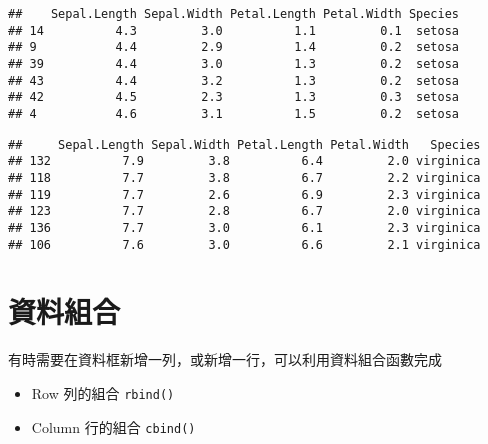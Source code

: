 \documentclass[]{book}
\newenvironment{Shaded}{\begin{snugshade}}{\end{snugshade}}
\newcommand{\KeywordTok}[1]{\textcolor[rgb]{0.13,0.29,0.53}{\textbf{{#1}}}}
\newcommand{\DataTypeTok}[1]{\textcolor[rgb]{0.13,0.29,0.53}{{#1}}}
\newcommand{\NormalTok}[1]{{#1}}
\providecommand{\tightlist}{%
  \setlength{\itemsep}{0pt}\setlength{\parskip}{0pt}}
\begin{document}
\begin{Shaded}
\end{Shaded}

\begin{verbatim}
##    Sepal.Length Sepal.Width Petal.Length Petal.Width Species
## 14          4.3         3.0          1.1         0.1  setosa
## 9           4.4         2.9          1.4         0.2  setosa
## 39          4.4         3.0          1.3         0.2  setosa
## 43          4.4         3.2          1.3         0.2  setosa
## 42          4.5         2.3          1.3         0.3  setosa
## 4           4.6         3.1          1.5         0.2  setosa
\end{verbatim}

\begin{Shaded}
\end{Shaded}

\begin{verbatim}
##     Sepal.Length Sepal.Width Petal.Length Petal.Width   Species
## 132          7.9         3.8          6.4         2.0 virginica
## 118          7.7         3.8          6.7         2.2 virginica
## 119          7.7         2.6          6.9         2.3 virginica
## 123          7.7         2.8          6.7         2.0 virginica
## 136          7.7         3.0          6.1         2.3 virginica
## 106          7.6         3.0          6.6         2.1 virginica
\end{verbatim}

\section{資料組合}

有時需要在資料框新增一列，或新增一行，可以利用資料組合函數完成

\begin{itemize}
\tightlist
\item
  Row 列的組合 \texttt{rbind()}
\item
  Column 行的組合 \texttt{cbind()}
\end{itemize}
\end{document}
